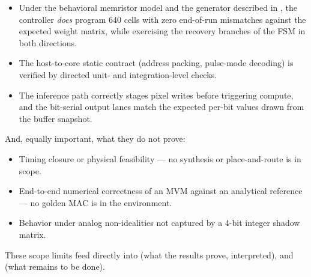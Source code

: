 \begin{itemize}
    \item Under the behavioral memristor model and the
           generator described in ,
          the controller \emph{does} program 640 cells with zero
          end-of-run mismatches against the expected weight matrix,
          while exercising the recovery branches of the FSM in both
          directions.
    \item The host-to-core static contract (address packing, pulse-mode
          decoding) is verified by directed unit- and integration-level
          checks.
    \item The inference path correctly stages pixel writes before
          triggering compute, and the bit-serial output lanes match the
          expected per-bit values drawn from the buffer snapshot.
\end{itemize}

\noindent And, equally important, what they do not prove:

\begin{itemize}
    \item Timing closure or physical feasibility --- no synthesis or
          place-and-route is in scope.
    \item End-to-end numerical correctness of an MVM against an
          analytical reference --- no golden MAC is in the environment.
    \item Behavior under analog non-idealities not captured by a 4-bit
          integer shadow matrix.
\end{itemize}

These scope limits feed directly into  (what the
results prove, interpreted), and  (what remains
to be done).
